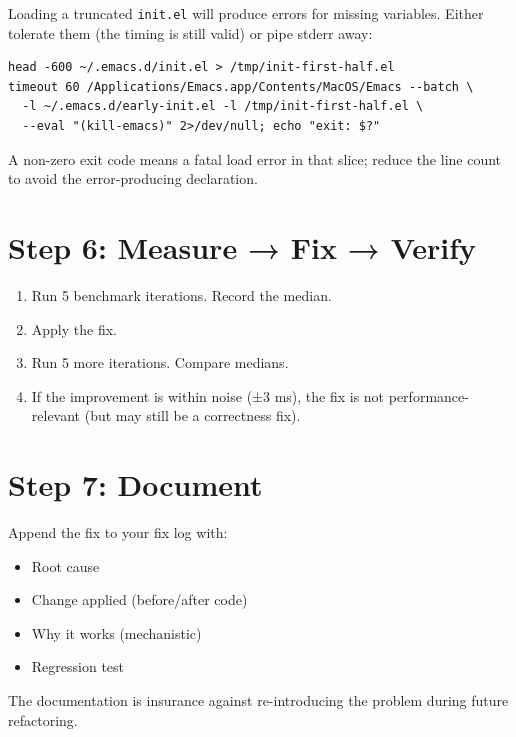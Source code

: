 Loading a truncated \texttt{init.el} will produce errors for missing variables. Either tolerate them (the timing is still valid) or pipe stderr away:

\begin{verbatim}
head -600 ~/.emacs.d/init.el > /tmp/init-first-half.el
timeout 60 /Applications/Emacs.app/Contents/MacOS/Emacs --batch \
  -l ~/.emacs.d/early-init.el -l /tmp/init-first-half.el \
  --eval "(kill-emacs)" 2>/dev/null; echo "exit: $?"
\end{verbatim}

A non-zero exit code means a fatal load error in that slice; reduce the line count to avoid the error-producing declaration.

\section{Step 6: Measure → Fix → Verify}\label{step-6-measure-fix-verify}

\begin{enumerate}
\item Run 5 benchmark iterations. Record the median.
\item Apply the fix.
\item Run 5 more iterations. Compare medians.
\item If the improvement is within noise (±3 ms), the fix is not performance-relevant (but may still be a correctness fix).
\end{enumerate}

\section{Step 7: Document}\label{step-7-document}

Append the fix to your fix log with:

\begin{itemize}
\item Root cause
\item Change applied (before/after code)
\item Why it works (mechanistic)
\item Regression test
\end{itemize}

The documentation is insurance against re-introducing the problem during future refactoring.

